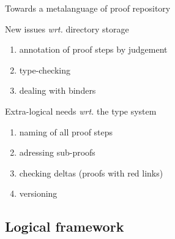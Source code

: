 \documentclass[ignorenonframetext,red]{beamer}
\begin{document}
\begin{frame}{Towards a metalanguage of proof repository}
  \begin{block}{New issues \emph{wrt.} directory storage}
    \begin{enumerate}
    \item annotation of proof steps by judgement
    \item type-checking
    \item dealing with binders
    \end{enumerate}
  \end{block}
  \begin{block}{Extra-logical needs \emph{wrt.} the type system}
    \begin{enumerate}
    \item naming of all proof steps
    \item adressing sub-proofs
    \item checking deltas (proofs with red links)
    \item versioning
    \end{enumerate}
  \end{block}
\end{frame}

\subsection{Logical framework}
\end{document}

